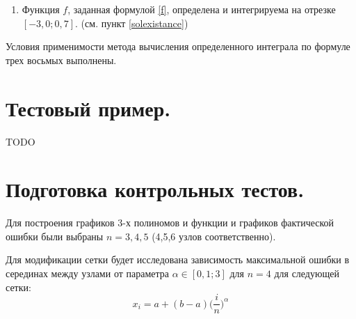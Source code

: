 \documentclass[a4paper, 12pt]{article}
\begin{document}
	\begin{enumerate}
		\item Функция $f$, заданная формулой \eqref{f}, определена и интегрируема на отрезке $[-3,0;0,7]$. (см. пункт \ref{solexistance})
	\end{enumerate}
	
	Условия применимости метода вычисления определенного интеграла по формуле трех восьмых выполнены.
	
	\section{Тестовый пример.}
	
	TODO
	
	\section{Подготовка контрольных тестов.}
	
	Для построения графиков 3-х полиномов и функции и графиков фактической ошибки были выбраны $n=3,4,5$ (4,5,6 узлов соответственно).
	
	Для модификации сетки будет исследована зависимость максимальной ошибки в серединах между узлами от параметра $\alpha\in[0,1;3]$ для $n=4$ для следующей сетки:
	\begin{equation} \label{grid}
		x_i=a+(b-a)\bigg(\frac{i}{n}\bigg)^\alpha
	\end{equation}
	
\end{document}
